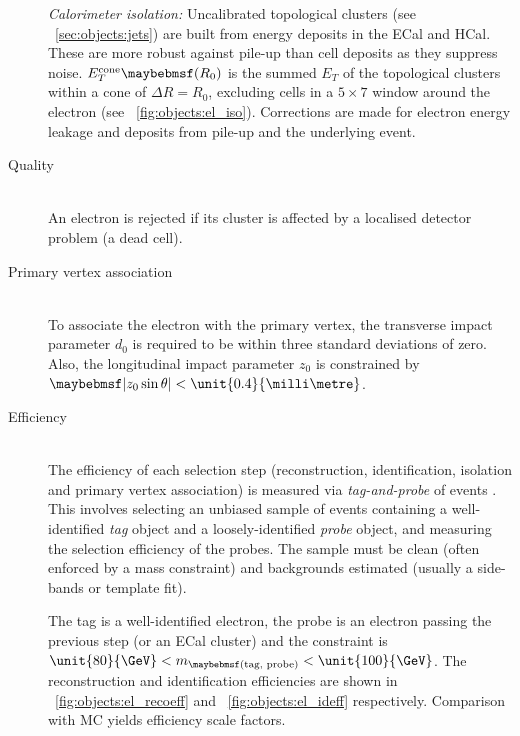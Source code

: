 \begin{description}
	\textit{Calorimeter isolation:} Uncalibrated topological clusters (see 
	\Section~\ref{sec:objects:jets}) are built from energy deposits in the \ac{ECal} 
	and \ac{HCal}. These are more robust against pile-up than cell deposits as they 
	suppress noise. $E_T^{\text{cone}}\parenths{R_0}$ is the summed $E_T$ of the 
	topological clusters within a cone of $\Delta R = R_0$, excluding cells in a 
	$5 \times 7$ window around the electron (see \Figure~\ref{fig:objects:el_iso}). 
	Corrections are made for electron energy leakage and deposits from pile-up and the 
	underlying event.
\item[Quality] \hfill \\
	An electron is rejected if its cluster is affected by a localised detector problem 
	(\eg a dead cell).
\item[Primary vertex association] \hfill \\
	To associate the electron with the primary vertex, the transverse impact parameter 
	$d_0$ is required to be within three standard deviations of zero. Also, the 
	longitudinal impact parameter $z_0$ is constrained by $\mods{z_0 \sin\theta} < 
	\unit{0.4}{\milli\metre}$.
\item[Efficiency] \hfill \\
	The efficiency of each selection step (reconstruction, identification, isolation and 
	primary vertex association) is measured via \textit{tag-and-probe} of 
	\HepProcess{\PZ \HepTo \Pe\Pe} events \cite{ElectronPerf:2010,ElectronPerf:2012}. 
	This involves selecting an unbiased sample of events containing a well-identified 
	\textit{tag} object and a loosely-identified \textit{probe} object, and measuring the 
	selection efficiency of the probes. The sample must be clean (often enforced by a 
	mass constraint) and backgrounds estimated (usually a side-bands or template fit).

	The tag is a well-identified electron, the probe is an electron passing the previous 
	step (or an \ac{ECal} cluster) and the constraint is $\unit{80}{\GeV} < 
	m_{\parenths{\text{tag, probe}}} < \unit{100}{\GeV}$. The reconstruction and 
	identification efficiencies are shown in \Figure~\ref{fig:objects:el_recoeff} and 
	\Figure~\ref{fig:objects:el_ideff} respectively. Comparison with MC yields efficiency 
	scale factors.
\end{description}

